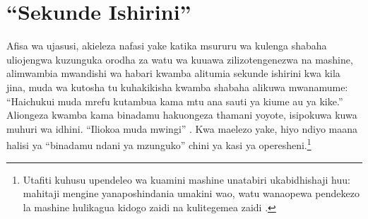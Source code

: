 \chapter{“Sekunde Ishirini”}
\label{sec:1}
Afisa wa ujasusi, akieleza nafasi yake katika msururu wa kulenga shabaha uliojengwa kuzunguka orodha za watu wa kuuawa zilizotengenezwa na mashine, alimwambia mwandishi wa habari kwamba alitumia sekunde ishirini kwa kila jina, muda wa kutosha tu kuhakikisha kwamba shabaha alikuwa mwanamume: “Haichukui muda mrefu kutambua kama mtu ana sauti ya kiume au ya kike.” Aliongeza kwamba kama binadamu hakuongeza thamani yoyote, isipokuwa kuwa muhuri wa idhini. “Iliokoa muda mwingi” \autocite{abraham2024lavender}. Kwa maelezo yake, hiyo ndiyo maana halisi ya “binadamu ndani ya mzunguko” chini ya kasi ya operesheni.\footnote{Utafiti kuhusu upendeleo wa kuamini mashine unatabiri ukabidhishaji huu: mahitaji mengine yanaposhindania umakini wao, watu wanaopewa pendekezo la mashine hulikagua kidogo zaidi na kulitegemea zaidi \autocite{parasuraman2010complacency}.}

